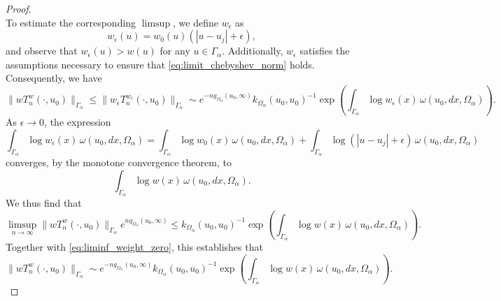\documentclass[12pt,oneside,reqno]{amsart}
\theoremstyle{definition}
\numberwithin{equation}{section}
\renewcommand{\Cap}{\operatorname{Cap}}
\begin{document}
\begin{proof}
\begin{equation}
		\label{eq:liminf_weight_zero}
	\end{equation}
To estimate the corresponding $\limsup$, we define $w_\epsilon$ as
	\begin{equation}
	w_\epsilon(u) = w_0(u)(|u-u_j|+\epsilon),
	\end{equation}
	and observe that $w_\epsilon(u)>w(u)$ for any $u\in \Gamma_\alpha$. Additionally, $w_\epsilon$ satisfies the assumptions necessary to ensure that 
	\eqref{eq:limit_chebyshev_norm} holds. Consequently, we have
	\[
		\|w T_n^{w}(\cdot,u_0)\|_{\Gamma_\alpha}\leq \|w_{\epsilon} T_n^{w_{\epsilon}}(\cdot,u_0)\|_{\Gamma_\alpha}\sim e^{-ng_{\Omega_\alpha}(u_0,\infty)}k_{\Omega_\alpha}(u_0,u_0)^{-1}\exp\left(\int_{\Gamma_\alpha} \log w_{\epsilon}(x)\,\omega(u_0,dx,\Omega_{\alpha})\right).
	\]
	As $\epsilon\rightarrow 0$, the expression
	\[\int_{\Gamma_\alpha}\log w_\epsilon(x)\,\omega(u_0,dx,\Omega_{\alpha}) = \int_{\Gamma_\alpha}\log w_0(x)\,\omega(u_0,dx,\Omega_{\alpha})+\int_{\Gamma_\alpha}\log(|u-u_j|+\epsilon)\,\omega(u_0,dx,\Omega_{\alpha})\]
	converges, by the monotone convergence theorem, to
	\[\int_{\Gamma_\alpha}\log w(x)\,\omega(u_0,dx,\Omega_{\alpha}).\]
	We thus find that 
	\begin{equation}
	\limsup_{n\rightarrow \infty}
	   \|w T_n^{w}(\cdot,u_0)\|_{\Gamma_{\alpha}}e^{ng_{\Omega_\alpha}(u_0,\infty)}	   
	   \leq k_{\Omega_\alpha}(u_0,u_0)^{-1}
	   \exp\left(\int_{\Gamma_\alpha} \log w(x)\,\omega(u_0,dx,\Omega_{\alpha})\right).
	   \end{equation}
	Together with \eqref{eq:liminf_weight_zero}, this establishes that
	\begin{equation} \label{As}		
	\|w T_n^{w}(\cdot,u_0)\|_{\Gamma_\alpha}\sim  e^{-ng_{\Omega_\alpha}(u_0,\infty)}k_{\Omega_\alpha}(u_0,u_0)^{-1}\exp\left(\int_{\Gamma_\alpha} \log w(x)\,\omega(u_0,dx,\Omega_{\alpha})\right).
	\end{equation}


\end{proof}
\end{document}
